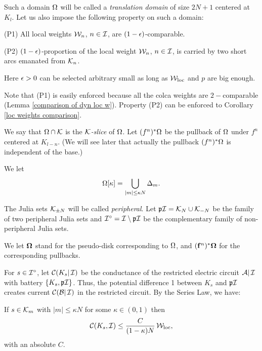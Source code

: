   

 Such a domain ${\Omega}$ will be called a {\it translation domain} of size
 $2N+1$ centered at $K_l$. 
Let us also   impose the following property on such a domain:

\ssk\nin (P1)
All local weights ${\mathcal W}_n$, $n\in {\mathcal I}$,  are $(1-{\epsilon})$-comparable.

\ssk\nin (P2)
$(1-{\epsilon})$-proportion of the local weight ${\mathcal W}_n$, $n\in {\mathcal I}$,
is carried by two short arcs emanated from ${\mathcal K}_n$.

\ssk Here ${\epsilon}>0$ can be selected arbitrary small as long as
${\mathcal W}_{\mathrm{loc}}$ and $p$ are big enough.  

\ssk Note that (P1) is easily enforced because all the colca weights are
$2-$comparable (Lemma \ref{comparison of dyn loc w}). 
Property (P2) can be enforced to Corollary \ref{loc weights comparison}. 


 We say that  ${\Omega}\cap {\mathcal K}$ is the {\it ${\mathcal K}$-slice} of ${\Omega}$.
Let  $(f^n)^*{\Omega} $ be the pullback of ${\Omega}$ under $f^n$ centered at $K_{l-n}$.
(We will see later that  actually  the pullback  $(f^n)^*{\Omega} $
is independent of the base.) 

We let
$$
  {\Omega}[\kappa]= \bigcup_{|m| \leq \kappa N} {\Delta}_m. 
$$

The Julia sets ${\mathcal K}_{\pm N} $ will be called {\it peripheral}. Let
${\mathfrak{p}}{\mathcal I}= {\mathcal K}_N\cup {\mathcal K}_{-N}$ be the family  of two peripheral Julia sets
and ${\mathcal I}^\circ= {\mathcal I}\setminus {\mathfrak{p}}{\mathcal I}$ be the complementary family of non-peripheral Julia sets. 



We let  ${\boldsymbol{{\Omega}}}$ stand for the pseudo-disk corresponding to ${\Omega}$, and  $({\mathbf{f}}^n)^*{\boldsymbol{{\Omega}}}$ for the corresponding  pullbacks.

For $s\in {\mathcal I}^\circ$, let ${\mathcal C}(K_s |\, {\mathcal I}) $   be the conductance of the restricted electric circuit ${\mathcal A}|\, {\mathcal I}$ with battery $\{K_s , {{\mathfrak{p}}}{\mathcal I}\} $. 
Thus,  the potential difference 1 between $K_s$ and ${{\mathfrak{p}}}{\mathcal I}$ 
creates current  ${\mathcal C}({\mathcal B} |\, {\mathcal I}) $ in the restricted circuit. 
By the Series Law, we have: 

If $s\in {\mathcal K}_m$ with $|m|\leq  \kappa N$ for some
$\kappa\in (0,1)$ then
\begin{equation}\label{T4}
  {\mathcal C} (K_s, {\mathcal I}  ) \leq \frac C{(1-\kappa )N} \, {\mathcal W}_{\mathrm{loc}},
\end{equation}
with an absolute $C$. 

